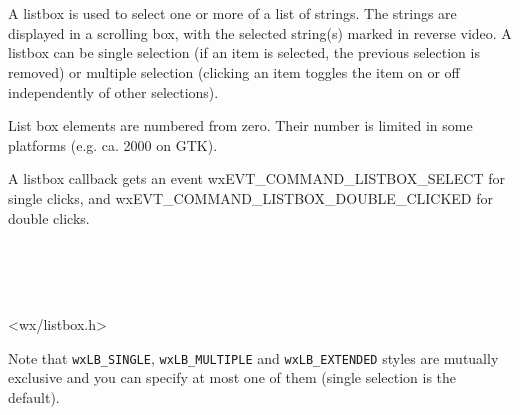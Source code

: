 \section{}\label{wxlistbox}

A listbox is used to select one or more of a list of strings. The
strings are displayed in a scrolling box, with the selected string(s)
marked in reverse video. A listbox can be single selection (if an item
is selected, the previous selection is removed) or multiple selection
(clicking an item toggles the item on or off independently of other
selections).

List box elements are numbered from zero. Their number is limited in
some platforms (e.g. ca. 2000 on GTK).

A listbox callback gets an event wxEVT\_COMMAND\_LISTBOX\_SELECT for single clicks, and
wxEVT\_COMMAND\_LISTBOX\_DOUBLE\_CLICKED for double clicks.


\\
\\
\\


<wx/listbox.h>


\twocolwidtha{5cm}%
\begin{twocollist}\itemsep=0pt
\end{twocollist}

Note that {\tt wxLB\_SINGLE}, {\tt wxLB\_MULTIPLE} and {\tt wxLB\_EXTENDED}
styles are mutually exclusive and you can specify at most one of them (single
selection is the default).

